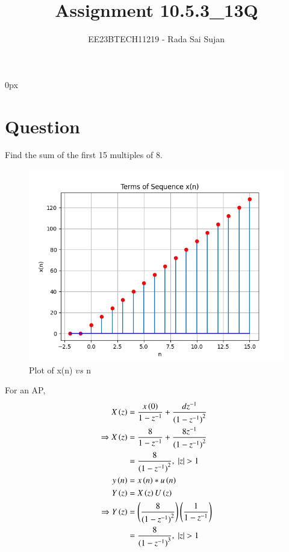 \documentclass[journal,12pt,twocolumn]{IEEEtran}
\theoremstyle{remark}
\begin{document}
\parindent 0px

\title{Assignment 10.5.3\_13Q}
\author{EE23BTECH11219 - Rada Sai Sujan$^{}$%
}
\maketitle
\newpage
\bigskip
\section*{Question}
Find the sum of the first 15 multiples of 8. \\
\solution

    \begin{figure}[ht]
        \centering
        \includegraphics[width=\columnwidth]{figs/a.png}
        \caption{Plot of x(n) $vs$ n}
        \label{fig:10.5.3.13.1}
    \end{figure}
For an AP,
\begin{align}
    X\brak z &= \dfrac{ x\brak 0 }{1-z^{-1}} + \dfrac{dz^{-1}}{{(1-z^{-1})}^{2}}    \\
    \Rightarrow X\brak z &= \dfrac{8}{1-z^{-1}} + \dfrac{8z^{-1}}{{(1-z^{-1})}^{2}} \\
    &= \dfrac{8}{({1-z^{-1})}^{2}} , \;|z|>1    \\
    y\brak{n}&=x\brak{n}\ast u\brak{n}\\
    Y\brak{z}&=X\brak{z}U\brak{z}   \\
    \Rightarrow Y\brak{z}&=\brak{\dfrac{8}{({1-z^{-1})}^{2}}}\brak{\dfrac{1}{1-z^{-1}}}  \\
    &=\dfrac{8}{({1-z^{-1})}^{3}} , \;|z|>1
 \end{align}
\end{document}
